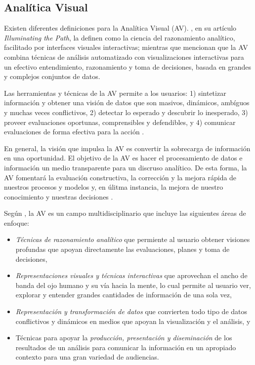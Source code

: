 \subsection{Analítica Visual}\label{sec:analitica_visual}

Existen diferentes definiciones para la Analítica Visual (AV). \cite{Thomas2005}, en su artículo \textit{Illuminating the Path}, la definen como la ciencia del razonamiento analítico, facilitado por interfaces visuales interactivas; mientras que \cite{Keim2008} mencionan que la AV combina técnicas de análisis automatizado con visualizaciones interactivas para un efectivo entendimiento, razonamiento y toma de decisiones, basada en grandes y complejos conjuntos de datos.

Las herramientas y técnicas de la AV permite a los usuarios: 1) sintetizar información y obtener una visión de datos que son masivos, dinámicos, ambíguos y muchas veces conflictivos, 2) detectar lo esperado y descubrir lo inesperado, 3) proveer evaluaciones oportunas, comprensibles y defendibles, y 4) comunicar evaluaciones de forma efectiva para la acción \citep{Keim2008, Thomas2005}.

En general, la visión que impulsa la AV es convertir la sobrecarga de información en una oportunidad. El objetivo de la AV es hacer el procesamiento de datos e información un medio transparente para un discruso analítico. De esta forma, la AV fomentará la evaluación constructiva, la corrección y la mejora rápida de nuestros procesos y modelos y, en úlitma instancia, la mejora de nuestro conocimiento y nuestras decisiones \citep{Keim2008}.

Según \cite{Thomas2005}, la AV es un campo multidisciplinario que incluye las siguientes áreas de enfoque:

\begin{itemize}
    \item \textit{Técnicas de razonamiento analítico} que permiente al usuario obtener visiones profundas que apoyan directamente las evaluaciones, planes y toma de decisiones,
    \item \textit{Representaciones visuales y técnicas interactivas} que aprovechan el ancho de banda del ojo humano y su vía hacia la mente, lo cual permite al usuario ver, explorar y entender grandes cantidades de información de una sola vez,
    \item \textit{Representación y transformación de datos} que convierten todo tipo de datos conflictivos y dinámicos en medios que apoyan la visualización y el análisis, y
    \item Técnicas para apoyar la \textit{producción, presentación y diseminación} de los resultados de un análisis para comunicar la información en un apropiado contexto para una gran variedad de audiencias.
\end{itemize} 

